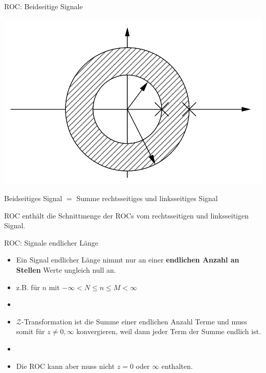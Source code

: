 \documentclass[14pt, aspectratio=169, handout]{beamer}
\begin{document}
\begin{frame}{ROC: Beidseitige Signale}
    \begin{minipage}[t]{0.45\textwidth}
        \vspace*{0.1cm}
        \includegraphics[width=\linewidth]{figures/Beidseitig.png}
    \end{minipage}
    \hfill
    \begin{minipage}[t]{0.45\textwidth}
        \vspace*{-0.5cm}
        Beidseitiges Signal $=$ Summe rechtsseitiges und linksseitiges Signal\\
        \vspace*{0.5cm}
        
        ROC enthält die Schnittmenge der ROCs vom rechtsseitigen und linksseitigen Signal.
    \end{minipage}
\end{frame}

\begin{frame}{ROC: Signale endlicher Länge}
    \begin{itemize}
        \item Ein Signal endlicher Länge nimmt nur an einer \textbf{endlichen Anzahl an Stellen} Werte ungleich null an.
        \item[] z.B. für $n$ mit $ -\infty < N \leq n \leq M <\infty $
        \item[] 
        \item $\mathcal{Z}$-Transformation ist die Summe einer endlichen Anzahl Terme und muss somit für $z\neq 0, \infty $ konvergieren, weil dann jeder Term der Summe endlich ist.
        \item[] 
        \item Die ROC kann aber muss nicht $z=0$ oder $\infty$ enthalten.
    \end{itemize}
\end{frame}
\end{document}
